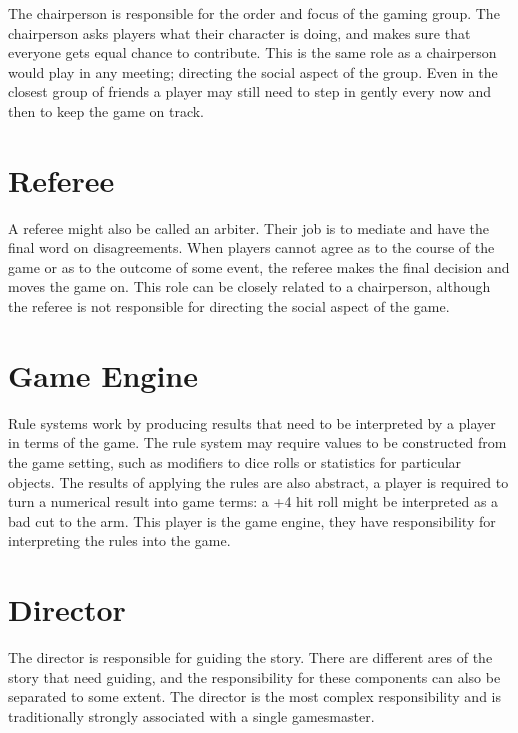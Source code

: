 \documentclass[twoside]{book}
\begin{document}
The chairperson is responsible for the order and focus of the gaming group. The chairperson asks players what their character is doing, and makes sure that everyone gets equal chance to contribute. This is the same role as a chairperson would play in any meeting; directing the social aspect of the group. Even in the closest group of friends a player may still need to step in gently every now and then to keep the game on track.

\section{Referee}

A referee might also be called an arbiter. Their job is to mediate and have the final word on disagreements. When players cannot agree as to the course of the game or as to the outcome of some event, the referee makes the final decision and moves the game on. This role can be closely related to a chairperson, although the referee is not responsible for directing the social aspect of the game.

\section{Game Engine}

Rule systems work by producing results that need to be interpreted by a player in terms of the game. The rule system may require values to be constructed from the game setting, such as modifiers to dice rolls or statistics for particular objects. The results of applying the rules are also abstract, a player is required to turn a numerical result into game terms: a +4 hit roll might be interpreted as a bad cut to the arm. This player is the game engine, they have responsibility for interpreting the rules into the game.

\section{Director}

The director is responsible for guiding the story. There are different ares of the story that need guiding, and the responsibility for these components can also be separated to some extent. The director is the most complex responsibility and is traditionally strongly associated with a single gamesmaster.
\end{document}
